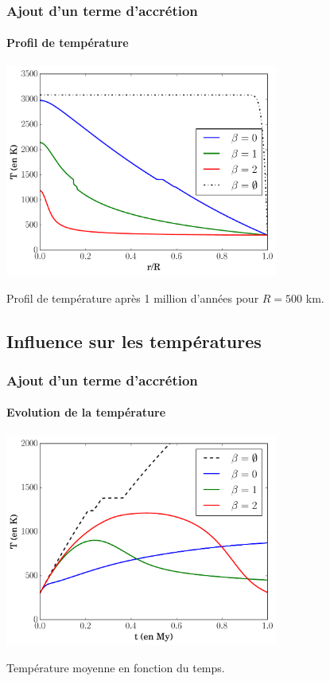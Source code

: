 \documentclass{beamer}
\begin{document}
\begin{frame}
	\frametitle{Ajout d'un terme d'accrétion}
	\framesubtitle{Profil de température}
\vspace{-0.5cm}

\center \includegraphics[width = 9cm]{figures/profil_acre.pdf} 
 
Profil de température après 1 million d'années pour $R = 500$ km.
	  	
\end{frame}

\subsection{Influence sur les températures}
\begin{frame}
	\frametitle{Ajout d'un terme d'accrétion}
	\framesubtitle{Evolution de la température}

\center \includegraphics[width = 9cm]{figures/tempMoy_acretion.pdf}

Température moyenne en fonction du temps.

\end{frame}
\end{document}
